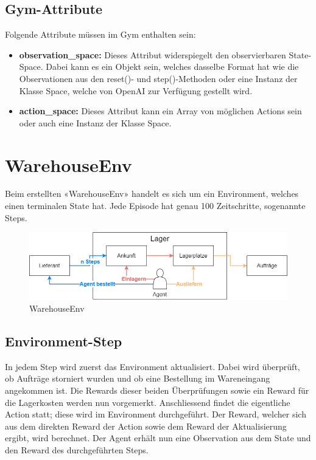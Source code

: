 \subsection{Gym-Attribute}
Folgende Attribute müssen im Gym enthalten sein:
\begin{itemize}
    \item \textbf{observation\_space:} Dieses Attribut widerspiegelt den observierbaren State-Space. Dabei kann es ein Objekt sein, welches dasselbe Format hat wie die Observationen aus den reset()- und step()-Methoden oder eine Instanz der Klasse Space, welche von OpenAI zur Verfügung gestellt wird.
    \item \textbf{action\_space:} Dieses Attribut kann ein Array von möglichen Actions sein oder auch eine Instanz der Klasse Space.
\end{itemize}


\section{WarehouseEnv}
\label{sec:warehouse}
Beim erstellten «WarehouseEnv» handelt es sich um ein Environment, welches einen terminalen State hat. Jede Episode hat genau 100 Zeitschritte, sogenannte Steps. 

\begin{figure}[ht]
  \centering
  \includegraphics[width=\textwidth]{img/warehouse-env.png}
  \caption{WarehouseEnv}
    \label{fig:warehouse-env}
\end{figure} 

\newpage
\subsection{Environment-Step}
In jedem Step wird zuerst das Environment aktualisiert. Dabei wird überprüft, ob Aufträge storniert wurden und ob eine Bestellung im Wareneingang angekommen ist. Die Rewards dieser beiden Überprüfungen sowie ein Reward für die Lagerkosten werden nun vorgemerkt. Anschliessend findet die eigentliche Action statt; diese wird im Environment durchgeführt. Der Reward, welcher sich aus dem direkten Reward der Action sowie dem Reward der Aktualisierung ergibt, wird berechnet. Der Agent erhält nun eine Observation aus dem State und den Reward des durchgeführten Steps. \smallskip

